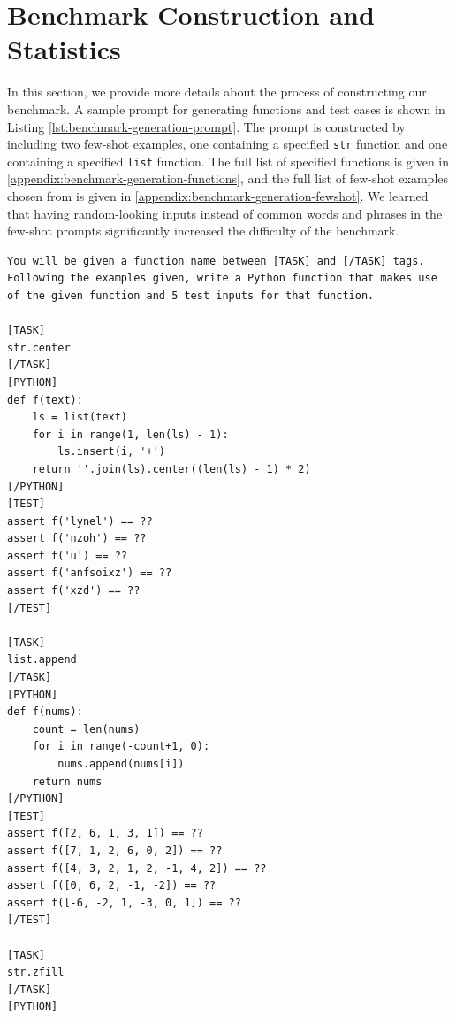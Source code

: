 \section{Benchmark Construction and Statistics} \label{appendix:construction}
In this section, we provide more details about the process of constructing our benchmark. A sample prompt for generating functions and test cases is shown in Listing \ref{lst:benchmark-generation-prompt}. The prompt is constructed by including two few-shot examples, one containing a specified \texttt{str} function and one containing a specified \texttt{list} function. The full list of specified functions is given in \ref{appendix:benchmark-generation-functions}, and the full list of few-shot examples chosen from is given in \ref{appendix:benchmark-generation-fewshot}. We learned that having random-looking inputs instead of common words and phrases in the few-shot prompts significantly increased the difficulty of the benchmark.

\begin{lstlisting}[caption={Sample prompt for generating functions and test cases},label={lst:benchmark-generation-prompt}, captionpos=t, breaklines=true]
You will be given a function name between [TASK] and [/TASK] tags. Following the examples given, write a Python function that makes use of the given function and 5 test inputs for that function.

[TASK]
str.center
[/TASK]
[PYTHON]
def f(text):
    ls = list(text)
    for i in range(1, len(ls) - 1):
        ls.insert(i, '+')
    return ''.join(ls).center((len(ls) - 1) * 2)
[/PYTHON]
[TEST]
assert f('lynel') == ??
assert f('nzoh') == ??
assert f('u') == ??
assert f('anfsoixz') == ??
assert f('xzd') == ??
[/TEST]

[TASK]
list.append
[/TASK]
[PYTHON]
def f(nums):
    count = len(nums)
    for i in range(-count+1, 0):
        nums.append(nums[i])
    return nums
[/PYTHON]
[TEST]
assert f([2, 6, 1, 3, 1]) == ??
assert f([7, 1, 2, 6, 0, 2]) == ??
assert f([4, 3, 2, 1, 2, -1, 4, 2]) == ??
assert f([0, 6, 2, -1, -2]) == ??
assert f([-6, -2, 1, -3, 0, 1]) == ??
[/TEST]

[TASK]
str.zfill
[/TASK]
[PYTHON]
\end{lstlisting}

